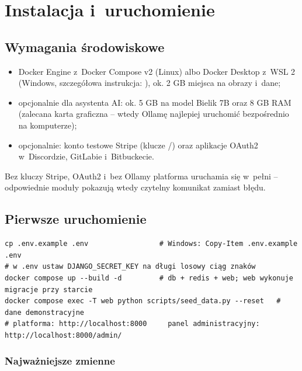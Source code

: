 \chapter{Instalacja i~uruchomienie}

\section{Wymagania środowiskowe}

\begin{itemize}
  \item Docker Engine z~Docker Compose v2 (Linux) albo Docker Desktop z~WSL 2 (Windows,
        szczegółowa instrukcja: ), ok. 2 GB miejsca na
        obrazy i~dane;
  \item opcjonalnie dla asystenta AI: ok. 5 GB na model Bielik 7B oraz 8 GB RAM (zalecana
        karta graficzna -- wtedy Ollamę najlepiej uruchomić bezpośrednio na komputerze);
  \item opcjonalnie: konto testowe Stripe (klucze /) oraz
        aplikacje OAuth2 w~Discordzie, GitLabie i~Bitbuckecie.
\end{itemize}

Bez kluczy Stripe, OAuth2 i~bez Ollamy platforma uruchamia się w~pełni -- odpowiednie moduły
pokazują wtedy czytelny komunikat zamiast błędu.

\section{Pierwsze uruchomienie}

\begin{lstlisting}
cp .env.example .env                 # Windows: Copy-Item .env.example .env
# w .env ustaw DJANGO_SECRET_KEY na długi losowy ciąg znaków
docker compose up --build -d         # db + redis + web; web wykonuje migracje przy starcie
docker compose exec -T web python scripts/seed_data.py --reset   # dane demonstracyjne
# platforma: http://localhost:8000     panel administracyjny: http://localhost:8000/admin/
\end{lstlisting}

\subsection*{Najważniejsze zmienne }


